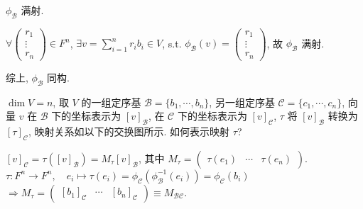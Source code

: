 \documentclass{note}
\begin{document}
$\phi_{\mathcal{B}}$ 满射.
\begin{pf}
    $\forall\begin{pmatrix}
        r_1\\
        \vdots\\
        r_n
    \end{pmatrix}\in F^n$, $\exists v=\sum_{i=1}^nr_ib_i\in V$, s.t. $\phi_{\mathcal{B}}(v)=\begin{pmatrix}
        r_1\\
        \vdots\\
        r_n
    \end{pmatrix}$, 故 $\phi_{\mathcal{B}}$ 满射.
\end{pf}

综上, $\phi_{\mathcal{B}}$ 同构.

$\dim V=n$, 取 $V$ 的一组定序基 $\mathcal{B}=\{b_1,\cdots,b_n\}$, 另一组定序基 $\mathcal{C}=\{c_1,\cdots,c_n\}$, 向量 $v$ 在 $\mathcal{B}$ 下的坐标表示为 $[v]_{\mathcal{B}}$, 在 $\mathcal{C}$ 下的坐标表示为 $[v]_{\mathcal{C}}$, $\tau$ 将 $[v]_{\mathcal{B}}$ 转换为 $[\tau]_{\mathcal{C}}$, 映射关系如以下的交换图所示. 如何表示映射 $\tau$?
\begin{center}
\end{center}

$[v]_{\mathcal{C}}=\tau([v]_{\mathcal{B}})=M_{\tau}[v]_{\mathcal{B}}$, 其中 $M_{\tau}=\begin{pmatrix}
    \tau(e_1)&\cdots&\tau(e_n)
\end{pmatrix}$.\\
$\tau:F^n\rightarrow F^n,\quad e_i\mapsto\tau(e_i)=\phi_{\mathcal{C}}(\phi_{\mathcal{B}}^{-1}(e_i))=\phi_{\mathcal{C}}(b_i)$\\
$\Longrightarrow M_{\tau}=\begin{pmatrix}
    [b_1]_{\mathcal{C}}&\cdots&[b_n]_{\mathcal{C}}
\end{pmatrix}\equiv M_{\mathcal{BC}}$.
\end{document}
